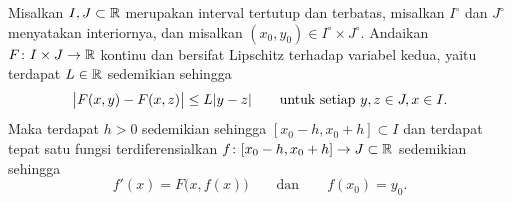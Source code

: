 \begin{samepage}
\begin{thm}%
Misalkan $I, J \subset {\mathbb{R}}$ merupakan interval tertutup dan terbatas,
misalkan $I^\circ$ dan $J^\circ$ menyatakan interiornya, dan 
misalkan $(x_0,y_0) \in I^\circ \times J^\circ$.
Andaikan $F \colon I \times J \to {\mathbb{R}}$ kontinu
dan bersifat Lipschitz terhadap variabel kedua, yaitu terdapat
$L \in {\mathbb{R}}$ sedemikian sehingga
\begin{equation*}
\bigl\lvert {F(x,y) - F(x,z)} \bigr\rvert \leq L \lvert {y-z} \rvert
\qquad \text{untuk setiap } y,z \in J, x \in I .
\end{equation*}
Maka terdapat $h > 0$ sedemikian sehingga $[x_0-h,x_0+h] \subset I$ dan terdapat tepat satu fungsi terdiferensialkan
$f \colon [x_0 - h, x_0 + h] \to J \subset {\mathbb{R}}$ sedemikian sehingga
\begin{equation*}
f'(x) = F\bigl(x,f(x)\bigr) \qquad \text{dan} \qquad f(x_0) = y_0.
\end{equation*}
\end{thm}
\end{samepage}

